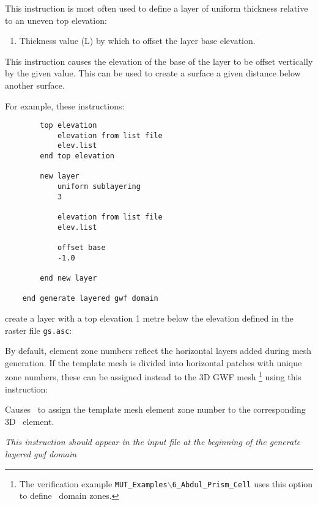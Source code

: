 This instruction is most often used to define a layer of uniform thickness relative to an uneven top elevation: 

    {\squish
    \begin{enumerate}
    \item {} Thickness value (L) by which to offset the layer base elevation.
    \end{enumerate}
    This instruction causes the elevation of the base of the layer to be offset vertically by the given value.  This
    can be used to create a surface a given distance below another surface.
}

    For example, these instructions:
\begin{verbatim}
        top elevation
            elevation from list file
            elev.list
        end top elevation

        new layer
            uniform sublayering
            3

            elevation from list file
            elev.list

            offset base                     
            -1.0                           

        end new layer

    end generate layered gwf domain
\end{verbatim}
 create a layer with a top elevation 1 metre below the elevation defined in the raster file \texttt{gs.asc}:
 
 By default, element zone numbers reflect the horizontal layers added during mesh generation.
 If the template mesh is divided into horizontal patches with unique zone numbers, these can be assigned instead to the 3D GWF mesh \footnote{The verification example \texttt{MUT\_Examples$\backslash$6\_Abdul\_Prism\_Cell} uses this option to define \swf\ domain zones.} using this instruction:

    {Causes \mut\ to assign the template mesh element zone number to the corresponding 3D \gwf\ element.

    {\em This instruction should appear in the input file at the beginning of the \textsf{generate layered gwf domain}}
    }

